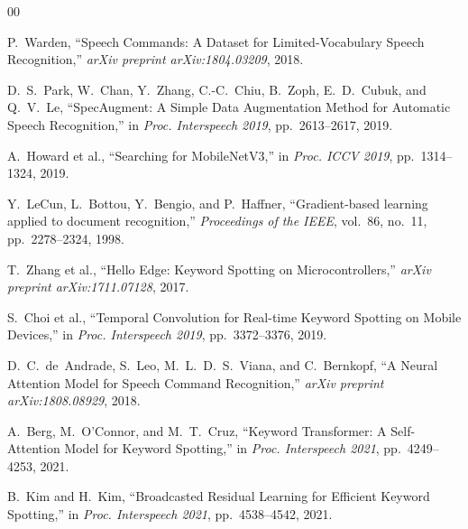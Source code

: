 \documentclass[conference]{IEEEtran}
\begin{document}
\begin{thebibliography}{00}

P.~Warden,
``Speech Commands: A Dataset for Limited-Vocabulary Speech Recognition,''
\textit{arXiv preprint arXiv:1804.03209}, 2018.

D.~S.~Park, W.~Chan, Y.~Zhang, C.-C.~Chiu, B.~Zoph, E.~D.~Cubuk, and
Q.~V.~Le,
``SpecAugment: A Simple Data Augmentation Method for Automatic Speech
Recognition,''
in \textit{Proc. Interspeech 2019}, pp.~2613--2617, 2019.

A.~Howard et al.,
``Searching for MobileNetV3,''
in \textit{Proc. ICCV 2019}, pp.~1314--1324, 2019.

Y.~LeCun, L.~Bottou, Y.~Bengio, and P.~Haffner,
``Gradient-based learning applied to document recognition,''
\textit{Proceedings of the IEEE}, vol.~86, no.~11, pp.~2278--2324, 1998.

T.~Zhang et al.,
``Hello Edge: Keyword Spotting on Microcontrollers,''
\textit{arXiv preprint arXiv:1711.07128}, 2017.

S.~Choi et al.,
``Temporal Convolution for Real-time Keyword Spotting on Mobile Devices,''
in \textit{Proc. Interspeech 2019}, pp.~3372--3376, 2019.

D.~C.~de~Andrade, S.~Leo, M.~L.~D.~S.~Viana, and C.~Bernkopf,
``A Neural Attention Model for Speech Command Recognition,''
\textit{arXiv preprint arXiv:1808.08929}, 2018.

A.~Berg, M.~O'Connor, and M.~T.~Cruz,
``Keyword Transformer: A Self-Attention Model for Keyword Spotting,''
in \textit{Proc. Interspeech 2021}, pp.~4249--4253, 2021.

B.~Kim and H.~Kim,
``Broadcasted Residual Learning for Efficient Keyword Spotting,''
in \textit{Proc. Interspeech 2021}, pp.~4538--4542, 2021.

\end{thebibliography}
\end{document}
